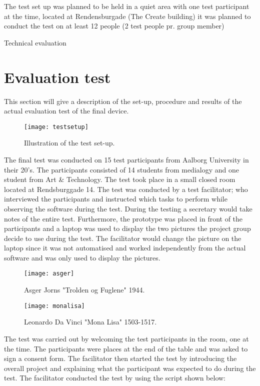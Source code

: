 The test set up was planned to be held in a quiet area with one test participant at the time, located at Rendensburgade (The Create building) it was planned to conduct the test on at least 12 people (2 test people pr. group member) 


Technical evaluation 



\section{Evaluation test}
This section will give a description of the set-up, procedure and results of the actual evaluation test of the final device. 

\begin{figure}[!h] 
\centering
\texttt{[image: testsetup]}
\caption{\label{fig:testsetup} Illustration of the test set-up.}
\end{figure}

The final test was conducted on 15 test participants from Aalborg University in their 20's. The participants consisted of 14 students from medialogy and one student from Art & Technology.  The test took place in a small closed room located at Rendsburggade 14. The test was conducted by a test facilitator; who interviewed the participants and instructed which tasks to perform while observing the software during the test. During the testing a secretary would take notes of the entire test. Furthermore, the prototype was placed in front of the participants and a laptop was used to display the two pictures the project group decide to use during the test. The facilitator would change the picture on the laptop since it was not automatised and worked independently from the actual software and was only used to display the pictures.   

\begin{figure}[!h] 
\centering
\texttt{[image: asger]}
\caption{\label{fig:asger} Asger Jorns "Trolden og Fuglene" 1944.}
\end{figure}

\begin{figure}[!h] 
\centering
\texttt{[image: monalisa]}
\caption{\label{fig:monalisa} Leonardo Da Vinci "Mona Lisa" 1503-1517.}
\end{figure}

The test was carried out by welcoming the test participants in the room, one at the time. The participants were places at the end of the table and was asked to sign a consent form. The facilitator then started the test by introducing the overall project and explaining what the participant was expected to do during the test. The facilitator conducted the test by using the script shown below:


